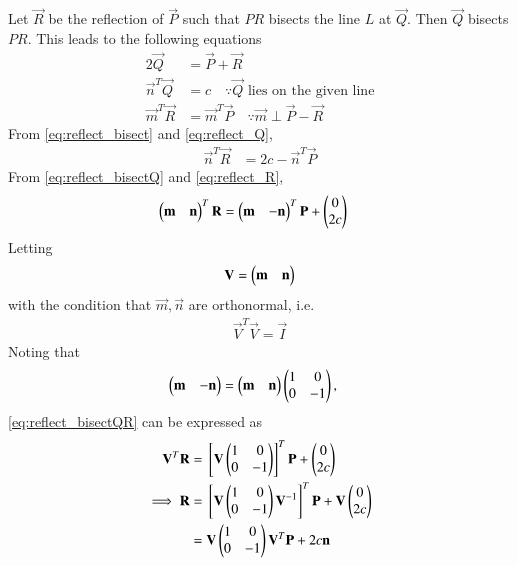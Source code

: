 \begin{enumerate}[label=\thesection.\arabic*.,ref=\thesection.\theenumi]
Let $\vec{R}$ be the reflection of $\vec{P}$ such that $PR$ bisects the line $L$ at $\vec{Q}$. Then $\vec{Q}$ bisects $PR$.  
This leads to the following equations
\begin{align}
\label{eq:reflect_bisect}
2\vec{Q} &= \vec{P}+\vec{R}
\\
\label{eq:reflect_Q}
\vec{n}^{T}\vec{Q} &= c \quad \because \vec{Q} \text{ lies on the given line}
\\
\label{eq:reflect_R}
\vec{m}^{T}\vec{R} &= \vec{m}^{T}\vec{P} \quad \because \vec{m}\perp \vec{P} - \vec{R}
\end{align}
%
From \eqref{eq:reflect_bisect} and \eqref{eq:reflect_Q},
\begin{align}
\label{eq:reflect_bisectQ}
\vec{n}^{T}\vec{R}  &= 2c - \vec{n}^{T}\vec{P}
\end{align}
%
From \eqref{eq:reflect_bisectQ} and \eqref{eq:reflect_R},
\begin{align}
\label{eq:reflect_bisectQR}
\begin{pmatrix}\mathbf{m} & \mathbf{n}\end{pmatrix}^T\mathbf{R} &= \begin{pmatrix}\mathbf{m} & -\mathbf{n}\end{pmatrix}^T\mathbf{P}+ \begin{pmatrix}0 \\ 2c\end{pmatrix}
\end{align}
%
Letting 
\begin{align}
\label{eq:reflect_mat}
\mathbf{V}=  \begin{pmatrix}\mathbf{m} & \mathbf{n}\end{pmatrix}
\end{align}
with the condition that $\vec{m},\vec{n}$ are orthonormal, i.e.
\begin{align}
\label{eq:reflect_ortho}
\vec{V}^T\vec{V}=  \vec{I}
\end{align}
%
Noting that 
\begin{align}
\label{eq:reflect_trans}
\begin{pmatrix}\mathbf{m} & -\mathbf{n}\end{pmatrix} &= \begin{pmatrix}\mathbf{m} & \mathbf{n}\end{pmatrix} \begin{pmatrix}1 & 0 \\ 0 & -1\end{pmatrix},
\end{align}
\eqref{eq:reflect_bisectQR} can be expressed as
%
\begin{align}
\label{eq:reflect_}
\mathbf{V}^T\mathbf{R} &=  {}\left[\mathbf{V}\begin{pmatrix}1 & 0 \\ 0 & -1\end{pmatrix}\right]^T\mathbf{P}+\begin{pmatrix}0 \\ 2c\end{pmatrix}
\\
\implies \mathbf{R} &= {}\left[\mathbf{V}\begin{pmatrix}1 & 0 \\ 0 & -1\end{pmatrix}\mathbf{V}^{-1}\right]^T\mathbf{P}+ \mathbf{V}\begin{pmatrix}0 \\ 2c\end{pmatrix}
\\
 &=\mathbf{V}\begin{pmatrix}1 & 0 \\ 0 & -1\end{pmatrix}\mathbf{V}^T \mathbf{P}+2c \mathbf{n}
\label{eq:reflect_mat_final}
\end{align}

\end{enumerate}
